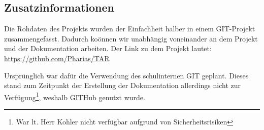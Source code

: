 \subsection{Zusatzinformationen}\label{vw_zusatzinformationen}
Die Rohdaten des Projekts wurden der Einfachheit halber in einem GIT-Projekt zusammengefasst.
Dadurch koönnen wir unabhängig voneinander an dem Projekt und der Dokumentation arbeiten.
\noindent Der Link zu dem Projekt lautet:\\
\url{https://github.com/Pharias/TAR}\par
\noindent Ursprünglich war dafür die Verwendung des schulinternen GIT geplant.
Dieses stand zum Zeitpunkt der Erstellung der Dokumentation allerdings nicht zur Verfügung\footnote{War lt. Herr Kohler nicht verfügbar aufgrund von Sicherheitsrisiken}, weshalb GITHub genutzt wurde.
